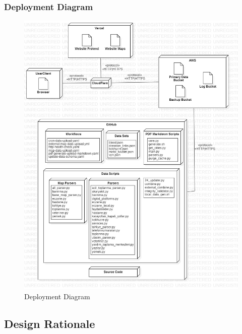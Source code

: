 \subsubsection{Deployment Diagram}

\begin{figure}[H]
  \centering
  \includegraphics[width=\linewidth]{img/deployment-diagram.jpg}
  \caption{Deployment Diagram}
\end{figure}

\subsection{Design Rationale}
